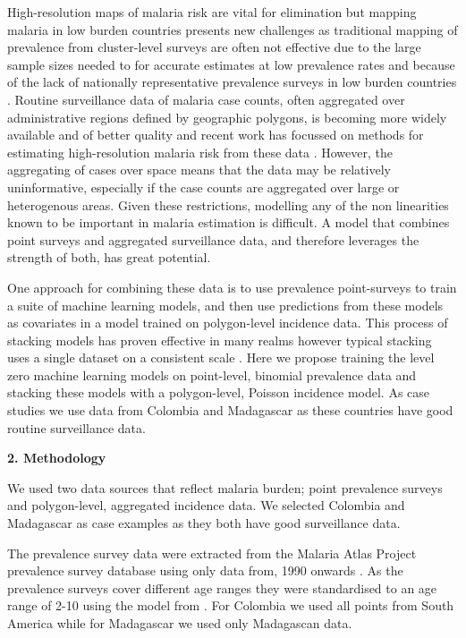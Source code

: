 \documentclass[11pt]{article}
\begin{document}
High-resolution maps of malaria risk are vital for elimination but mapping malaria in low burden countries presents new challenges as traditional mapping of prevalence from cluster-level surveys \cite{gething2011new, bhatt2017improved, gething2012long} are often not effective due to the large sample sizes needed to for accurate estimates at low prevalence rates and because of the lack of nationally representative prevalence surveys in low burden countries \cite{sturrock2016mapping, sturrock2014fine}. 
Routine surveillance data of malaria case counts, often aggregated over administrative regions defined by geographic polygons, is becoming more widely available and of better quality and recent work has focussed on methods for estimating high-resolution malaria risk from these data \cite{sturrock2014fine, wilson2017pointless, law2018variational, taylor2017continuous, li2012log}. 
However, the aggregating of cases over space means that the data may be relatively uninformative, especially if the case counts are aggregated over large or heterogenous areas. 
Given these restrictions, modelling any of the non linearities known to be important in malaria estimation is difficult. 
A model that combines point surveys and aggregated surveillance data, and therefore leverages the strength of both, has great potential.
 
One approach for combining these data is to use prevalence point-surveys to train a suite of machine learning models, and then use predictions from these models as covariates in a model trained on polygon-level incidence data. 
This process of stacking models has proven effective in many realms however typical stacking uses a single dataset on a consistent scale \cite{Sill2009, bhatt2017improved}. 
Here we propose training the level zero machine learning models on point-level, binomial prevalence data and stacking these models with a polygon-level, Poisson incidence model. 
As case studies we use data from Colombia and Madagascar as these countries have  good routine surveillance data.


{\bf 2. Methodology}

We used two data sources that reflect malaria burden; point prevalence surveys and polygon-level, aggregated incidence data. 
We selected Colombia and Madagascar as case examples as they both have good surveillance data.

The prevalence survey data were extracted from the Malaria Atlas Project prevalence survey database using only data from, 1990 onwards \cite{bhatt2015effect}. 
As the prevalence surveys cover different age ranges they were standardised to an age range of 2-10 using the model from \cite{smith2007standardizing}. 
For Colombia we used all points from South America while for Madagascar we used only Madagascan data.
\end{document}
